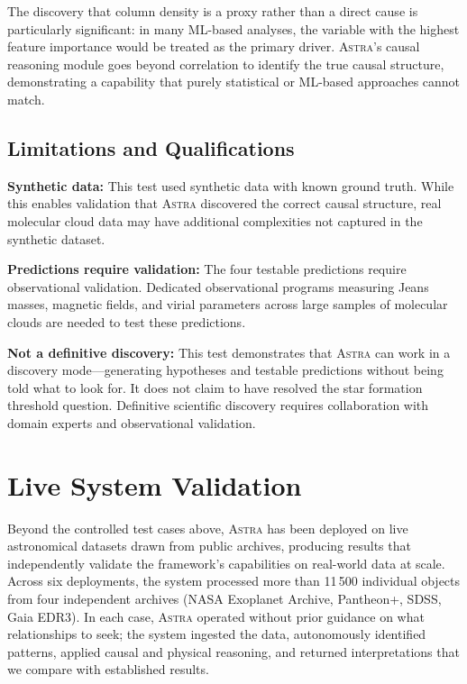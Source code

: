 \documentclass[usenatbib]{rasti}
\newcommand{\astra}{\textsc{Astra}\xspace}
\begin{document}
The discovery that column density is a proxy rather than a direct cause is particularly significant: in many ML-based analyses, the variable with the highest feature importance would be treated as the primary driver.
\astra's causal reasoning module goes beyond correlation to identify the true causal structure, demonstrating a capability that purely statistical or ML-based approaches cannot match.

\subsection{Limitations and Qualifications}
\label{sec:tc6:limitations}

\textbf{Synthetic data:}
This test used synthetic data with known ground truth.
While this enables validation that \astra discovered the correct causal structure, real molecular cloud data may have additional complexities not captured in the synthetic dataset.

\textbf{Predictions require validation:}
The four testable predictions require observational validation.
Dedicated observational programs measuring Jeans masses, magnetic fields, and virial parameters across large samples of molecular clouds are needed to test these predictions.

\textbf{Not a definitive discovery:}
This test demonstrates that \astra can work in a discovery mode---generating hypotheses and testable predictions without being told what to look for.
It does not claim to have resolved the star formation threshold question.
Definitive scientific discovery requires collaboration with domain experts and observational validation.

\section{Live System Validation}
\label{sec:live}

Beyond the controlled test cases above, \astra has been deployed on live astronomical datasets drawn from public archives, producing results that independently validate the framework's capabilities on real-world data at scale.
Across six deployments, the system processed more than 11\,500 individual objects from four independent archives (NASA Exoplanet Archive, Pantheon+, SDSS, Gaia EDR3).
In each case, \astra operated without prior guidance on what relationships to seek; the system ingested the data, autonomously identified patterns, applied causal and physical reasoning, and returned interpretations that we compare with established results.
\end{document}
